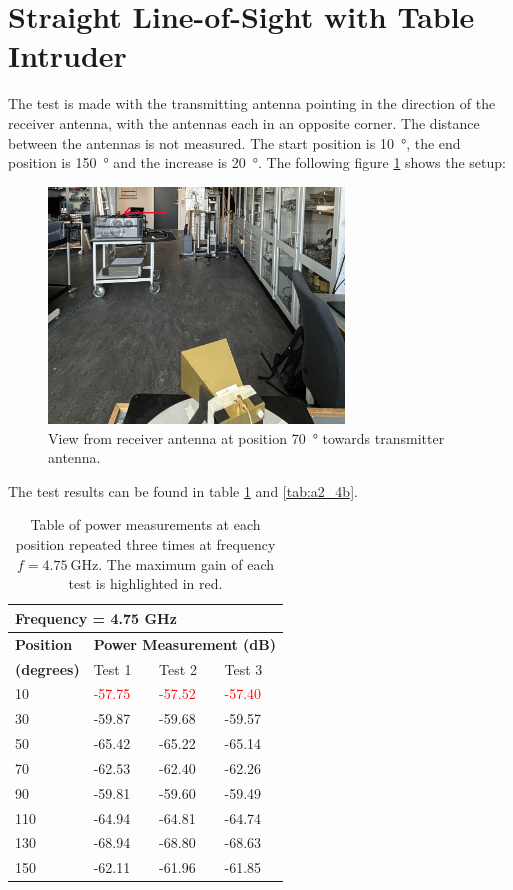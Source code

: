 \section{Straight Line-of-Sight with Table Intruder}
The test is made with the transmitting antenna pointing in the direction of the receiver antenna, with the antennas each in an opposite corner. The distance between the antennas is not measured. The start position is \SI{10}{\degree}, the end position is \SI{150}{\degree} and the increase is \SI{20}{\degree}. The following figure \ref{fig:a2_4} shows the setup:
\begin{figure}[H]
    \centering
    \includegraphics[width=0.7\textwidth]{figures/test_intruder_table.JPG}
    \caption{View from receiver antenna at position \SI{70}{\degree} towards transmitter antenna.} \label{fig:a2_4}
\end{figure}

The test results can be found in table \ref{tab:a2_4a} and \ref{tab:a2_4b}.
\begin{table}[H]
    \centering
    \begin{tabular}{l|l|l|l}
        \multicolumn{4}{l}{\textbf{Frequency = 4.75 GHz}}         \\
        \hline
        \textbf{Position} & \multicolumn{3}{l}{\textbf{Power Measurement (dB)}} \\
        \textbf{(degrees)}  & Test 1    & Test 2  & Test 3  \\
        \hline
        \hline
        10      & \textcolor{red}{-57.75}    & \textcolor{red}{-57.52}    & \textcolor{red}{-57.40} \\
        30      & -59.87    & -59.68    & -59.57 \\
        50      & -65.42    & -65.22    & -65.14 \\
        70      & -62.53    & -62.40    & -62.26 \\
        90      & -59.81    & -59.60    & -59.49 \\
        110     & -64.94    & -64.81    & -64.74 \\
        130     & -68.94    & -68.80    & -68.63 \\
        150     & -62.11    & -61.96    & -61.85
        \end{tabular}
    \caption{Table of power measurements at each position repeated three times at frequency $f=\SI{4.75}{\giga\hertz}$. The maximum gain of each test is highlighted in red.}
    \label{tab:a2_4a}
\end{table}

